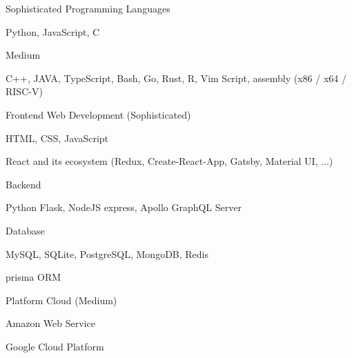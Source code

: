 

\begin{cventries}

  \cventry
  {Sophisticated}
  {Programming Languages}
  {}
  {}
  {
    \begin{cvitems}
      \item {Python, JavaScript, C}
    \end{cvitems}
  }

  \cventry
  {Medium}
  {}
  {}
  {}
  {
    \begin{cvitems}
      \item {C++, JAVA, TypeScript, Bash, Go, Rust, R, Vim Script, assembly (x86 / x64 / RISC-V)}
    \end{cvitems}
  }

  \cventry
  {Frontend}
  {Web Development (Sophisticated)}
  {}
  {}
  {
    \begin{cvitems}
      \item {HTML, CSS, JavaScript}
      \item {React and its ecosystem (Redux, Create-React-App, Gatsby, Material UI, ...)}
    \end{cvitems}
  }

  \cventry
  {Backend}
  {}
  {}
  {}
  {
    \begin{cvitems}
      \item {Python Flask, NodeJS express, Apollo GraphQL Server}
    \end{cvitems}
  }

  \cventry
  {Database}
  {}
  {}
  {}
  {
    \begin{cvitems}
      \item {MySQL, SQLite, PostgreSQL, MongoDB, Redis}
      \item {prisma ORM}
    \end{cvitems}
  }

  \cventry
  {Platform}
  {Cloud (Medium)}
  {}
  {}
  {
    \begin{cvitems}
      \item {Amazon Web Service}
      \item {Google Cloud Platform}
    \end{cvitems}
  }


\end{cventries}
